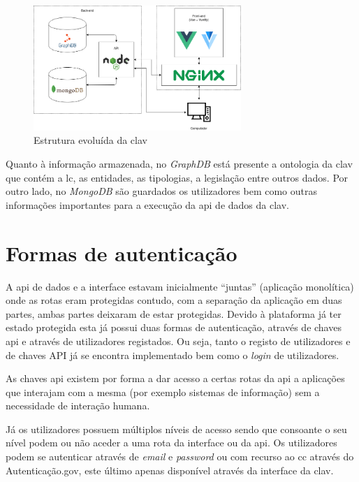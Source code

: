 \begin{figure}[H]
    \begin{center}
        \includegraphics[width=0.7\textwidth]{img/clav_struct2.png}
    \end{center}
    \caption{Estrutura evoluída da \acrshort{clav}}\label{fig:clav_struct2}
\end{figure}

Quanto à informação armazenada, no \textit{GraphDB} está presente a ontologia da \acrshort{clav} que contém a \acrshort{lc}, as entidades, as tipologias, a legislação entre outros dados. Por outro lado, no \textit{MongoDB} são guardados os utilizadores bem como outras informações importantes para a execução da \acrshort{api} de dados da \acrshort{clav}.

\section{Formas de autenticação}\label{sec:autenticacao}
A \acrshort{api} de dados e a interface estavam inicialmente ``juntas'' (aplicação monolítica) onde as rotas eram protegidas contudo, com a separação da aplicação em duas partes, ambas partes deixaram de estar protegidas. Devido à plataforma já ter estado protegida esta já possui duas formas de autenticação, através de chaves \acrshort{api} e através de utilizadores registados. Ou seja, tanto o registo de utilizadores e de chaves API já se encontra implementado bem como o \textit{login} de utilizadores.

As chaves \acrshort{api} existem por forma a dar acesso a certas rotas da \acrshort{api} a aplicações que interajam com a mesma (por exemplo sistemas de informação) sem a necessidade de interação humana.

Já os utilizadores possuem múltiplos níveis de acesso sendo que consoante o seu nível podem ou não aceder a uma rota da interface ou da \acrshort{api}. Os utilizadores podem se autenticar através de \textit{email} e \textit{password} ou com recurso ao \acrfull{cc} através do Autenticação.gov, este último apenas disponível através da interface da \acrshort{clav}.

